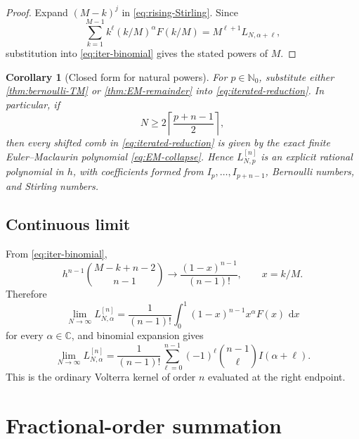\documentclass[11pt,oneside]{article}
\numberwithin{equation}{section}
\newtheorem{corollary}[theorem]{Corollary}
\theoremstyle{definition}
\theoremstyle{remark}
\newcommand{\C}{\mathbb C}
\newcommand{\N}{\mathbb N}
\newcommand{\dd}{\,\mathrm d}
\begin{document}
\begin{proof}
Expand \((M-k)^j\) in \eqref{eq:rising-Stirling}.  Since
\begin{equation}
 \sum_{k=1}^{M-1}k^\ell(k/M)^\alpha F(k/M)
 =M^{\ell+1}L_{N,\alpha+\ell},
 \label{eq:shift-base}
\end{equation}
substitution into \eqref{eq:iter-binomial} gives the stated powers of \(M\).
\end{proof}

\begin{corollary}[Closed form for natural powers]
\label{cor:iterated-natural}
For \(p\in\N_0\), substitute either \cref{thm:bernoulli-TM} or
\cref{thm:EM-remainder} into \eqref{eq:iterated-reduction}.  In particular, if
\begin{equation}
 N\ge2\left\lceil\frac{p+n-1}{2}\right\rceil,
 \label{eq:iterated-threshold}
\end{equation}
then every shifted comb in \eqref{eq:iterated-reduction} is given by the exact finite
Euler--Maclaurin polynomial \eqref{eq:EM-collapse}.  Hence
\(L_{N,p}^{[n]}\) is an explicit rational polynomial in \(h\), with coefficients formed
from \(I_p,\ldots,I_{p+n-1}\), Bernoulli numbers, and Stirling numbers.
\end{corollary}

\subsection{Continuous limit}

From \eqref{eq:iter-binomial},
\begin{equation}
 h^{n-1}\binom{M-k+n-2}{n-1}
 \longrightarrow\frac{(1-x)^{n-1}}{(n-1)!},
 \qquad x=k/M.
\end{equation}
Therefore
\begin{equation}
 \boxed{\displaystyle
 \lim_{N\to\infty}L_{N,\alpha}^{[n]}
 =\frac1{(n-1)!}\int_0^1(1-x)^{n-1}x^\alpha F(x)\,\dd x}
 \label{eq:iterated-limit}
\end{equation}
for every \(\alpha\in\C\), and binomial expansion gives
\begin{equation}
 \lim_{N\to\infty}L_{N,\alpha}^{[n]}
 =\frac1{(n-1)!}
 \sum_{\ell=0}^{n-1}(-1)^\ell\binom{n-1}{\ell}I(\alpha+\ell).
 \label{eq:iterated-limit-I}
\end{equation}
This is the ordinary Volterra kernel of order \(n\) evaluated at the right endpoint.

\section{Fractional-order summation}
\label{sec:fractional-sum}
\end{document}
